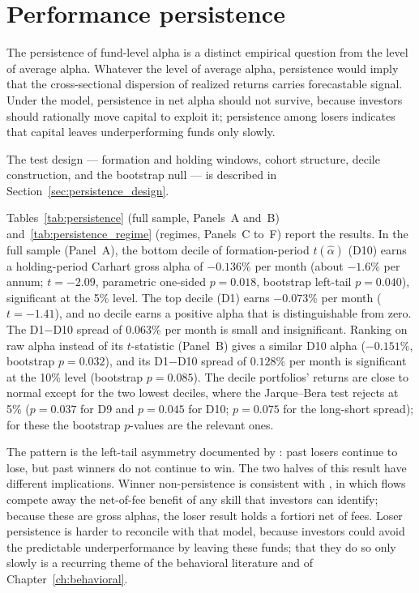 \documentclass[12pt, oneside]{report}
\begin{document}
\section{Performance persistence}
\label{sec:persistence}

\noindent The persistence of fund-level alpha is a distinct empirical
question from the level of average alpha. Whatever the level of average
alpha, persistence would imply that the cross-sectional
dispersion of realized returns carries forecastable signal. Under the
\textcite{BerkGreen2004} model, persistence in net alpha should not
survive, because investors should rationally move capital to exploit
it; persistence among losers indicates that capital leaves
underperforming funds only slowly.

The test design --- formation and holding windows, cohort structure,
decile construction, and the bootstrap null --- is described in
Section~\ref{sec:persistence_design}.



Tables~\ref{tab:persistence} (full sample, Panels~A and~B) and~\ref{tab:persistence_regime} (regimes, Panels~C to~F) report the results. In the full sample
(Panel~A), the bottom decile of formation-period $t(\hat{\alpha})$ (D10)
earns a holding-period Carhart gross alpha of $-0.136\%$ per month
(about $-1.6\%$ per annum; $t = -2.09$, parametric one-sided $p = 0.018$,
bootstrap left-tail $p = 0.040$), significant at the 5\% level. The top decile (D1) earns $-0.073\%$ per
month ($t = -1.41$), and no decile earns a positive alpha that is
distinguishable from zero. The D1$-$D10 spread of $0.063\%$ per month is
small and insignificant. Ranking on raw alpha instead of its $t$-statistic
(Panel~B) gives a similar D10 alpha ($-0.151\%$, bootstrap
$p = 0.032$), and its D1$-$D10 spread of $0.128\%$ per month is
significant at the 10\% level (bootstrap $p = 0.085$). The decile
portfolios' returns are close to normal except for the two lowest deciles,
where the Jarque--Bera test rejects at 5\% ($p = 0.037$ for D9 and
$p = 0.045$ for D10; $p = 0.075$ for the long-short spread); for these the
bootstrap $p$-values are the relevant ones.

The pattern is the left-tail asymmetry documented by
\textcite{Carhart1997}: past losers continue to lose, but past winners do
not continue to win. The two halves of this result have different
implications. Winner non-persistence is consistent with
\textcite{BerkGreen2004}, in which flows compete away the net-of-fee
benefit of any skill that investors can identify; because these are
gross alphas, the loser result holds a fortiori net of fees. Loser persistence is harder to
reconcile with that model, because investors could avoid the predictable
underperformance by leaving these funds; that they do so only slowly is a
recurring theme of the behavioral literature and of
Chapter~\ref{ch:behavioral}.
\end{document}
